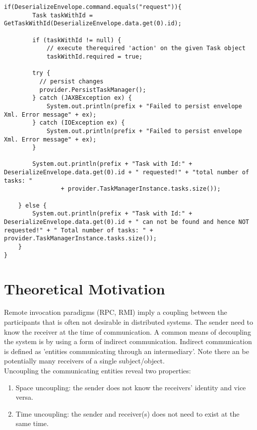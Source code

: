 \begin{lstlisting}[caption=receiver]
if(DeserializeEnvelope.command.equals("request")){
	    Task taskWithId = GetTaskWithId(DeserializeEnvelope.data.get(0).id);
		
	    if (taskWithId != null) {
		    // execute therequired 'action' on the given Task object
	      	taskWithId.required = true;
		
	    try {
		  // persist changes
		  provider.PersistTaskManager();
	    } catch (JAXBException ex) {
	        System.out.println(prefix + "Failed to persist envelope Xml. Error message" + ex);
	    } catch (IOException ex) {
	        System.out.println(prefix + "Failed to persist envelope Xml. Error message" + ex);
	    }
		
	    System.out.println(prefix + "Task with Id:" + DeserializeEnvelope.data.get(0).id + " requested!" + "total number of tasks: "
	            + provider.TaskManagerInstance.tasks.size());
		
	} else {
	    System.out.println(prefix + "Task with Id:" + DeserializeEnvelope.data.get(0).id + " can not be found and hence NOT requested!" + " Total number of tasks: " + provider.TaskManagerInstance.tasks.size());
	}
}
\end{lstlisting}





\section{Theoretical Motivation}
\label{jgroup_motivation}
Remote invocation paradigms (RPC, RMI) imply a coupling between the participants that is often not desirable in distributed systems. The sender need to know the receiver at the time of communication. A common means of decoupling the system is by using a form of indirect communication. Indirect communication is defined as 'entities communicating through an intermediary'. Note there an be potentially many receivers of a single subject/object. \\

Uncoupling the communicating entities reveal two properties: 

\begin{enumerate}
\item Space uncoupling: the sender does not know the receivers' identity and vice versa. 
\item Time uncoupling: the sender and receiver(s) does not need to exist at the same time.  
\end{enumerate}

